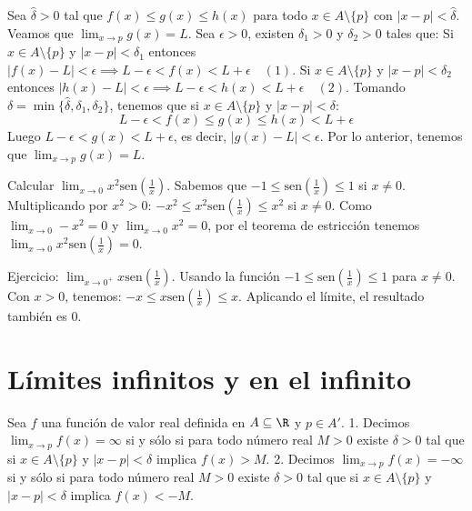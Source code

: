 \begin{dem} %
Sea $\hat{\delta} > 0$ tal que $f(x) \le g(x) \le h(x)$ para todo $x \in A \setminus \{p\}$ con $|x - p| < \hat{\delta}$. %
Veamos que $\lim_{x \to p} g(x) = L$. Sea $\epsilon > 0$, existen $\delta_1 > 0$ y $\delta_2 > 0$ tales que: %
Si $x \in A \setminus \{p\}$ y $|x - p| < \delta_1$ entonces $|f(x) - L| < \epsilon \implies L - \epsilon < f(x) < L + \epsilon \quad (1)$. %
Si $x \in A \setminus \{p\}$ y $|x - p| < \delta_2$ entonces $|h(x) - L| < \epsilon \implies L - \epsilon < h(x) < L + \epsilon \quad (2)$. %
Tomando $\delta = \min\{\hat{\delta}, \delta_1, \delta_2\}$, tenemos que si $x \in A \setminus \{p\}$ y $|x - p| < \delta$: %
$$ L - \epsilon < f(x) \le g(x) \le h(x) < L + \epsilon $$ %
Luego $L - \epsilon < g(x) < L + \epsilon$, es decir, $|g(x) - L| < \epsilon$. %
Por lo anterior, tenemos que $\lim_{x \to p} g(x) = L$. %
\end{dem}

\begin{example} %
Calcular $\lim_{x \to 0} x^2 \mathrm{sen}\left(\frac{1}{x}\right)$. %
Sabemos que $-1 \le \mathrm{sen}\left(\frac{1}{x}\right) \le 1$ si $x \neq 0$. %
Multiplicando por $x^2 > 0$: $-x^2 \le x^2 \mathrm{sen}\left(\frac{1}{x}\right) \le x^2$ si $x \neq 0$. %
Como $\lim_{x \to 0} -x^2 = 0$ y $\lim_{x \to 0} x^2 = 0$, %
por el teorema de estricción tenemos $\lim_{x \to 0} x^2 \mathrm{sen}\left(\frac{1}{x}\right) = 0$. %
\end{example}

\begin{remark} %
Ejercicio: $\lim_{x \to 0^+} x \mathrm{sen}\left(\frac{1}{x}\right)$. %
Usando la función $-1 \le \mathrm{sen}\left(\frac{1}{x}\right) \le 1$ para $x \neq 0$. %
Con $x > 0$, tenemos: $-x \le x \mathrm{sen}\left(\frac{1}{x}\right) \le x$. %
Aplicando el límite, el resultado también es $0$. %
\end{remark}

\section*{Límites infinitos y en el infinito} %

\begin{definicion} %
Sea $f$ una función de valor real definida en $A \subseteq \R$ y $p \in A'$. %
1. Decimos $\lim_{x \to p} f(x) = \infty$ si y sólo si para todo número real $M > 0$ existe $\delta > 0$ tal que si $x \in A \setminus \{p\}$ y $|x - p| < \delta$ implica $f(x) > M$. %
2. Decimos $\lim_{x \to p} f(x) = -\infty$ si y sólo si para todo número real $M > 0$ existe $\delta > 0$ tal que si $x \in A \setminus \{p\}$ y $|x - p| < \delta$ implica $f(x) < -M$. %
\end{definicion}

